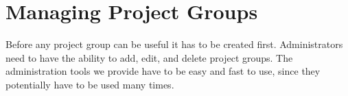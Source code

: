 \section{Managing Project Groups}
Before any project group can be useful it has to be created first.
Administrators need to have the ability to add, edit, and delete project groups.
The administration tools we provide have to be easy and fast to use, since they potentially have to be used many times.